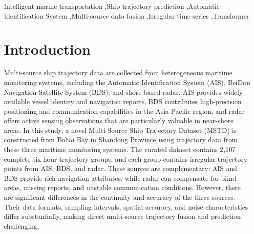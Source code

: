 \documentclass[a4paper,fleqn]{cas-dc}
\begin{document}
\begin{keywords}
Intelligent marine transportation \sep Ship trajectory prediction
\sep Automatic Identification System \sep Multi-source data fusion \sep Irregular time series \sep Transformer
\end{keywords}

\makeatletter{}\makeatother
\maketitle{}

\section{Introduction}

Multi-source ship trajectory data are collected from heterogeneous maritime monitoring systems, including the Automatic Identification System (AIS), BeiDou Navigation Satellite System (BDS), and shore-based radar. AIS provides widely available vessel identity and navigation reports, BDS contributes high-precision positioning and communication capabilities in the Asia-Pacific region, and radar offers active sensing observations that are particularly valuable in near-shore areas. In this study, a novel Multi-Source Ship Trajectory Dataset (MSTD) is constructed from Bohai Bay in Shandong Province using trajectory data from these three maritime monitoring systems. The curated dataset contains 2,107 complete six-hour trajectory groups, and each group contains irregular trajectory points from AIS, BDS, and radar. These sources are complementary: AIS and BDS provide rich navigation attributes, while radar can compensate for blind areas, missing reports, and unstable communication conditions. However, there are significant differences in the continuity and accuracy of the three sources. Their data formats, sampling intervals, spatial accuracy, and noise characteristics differ substantially, making direct multi-source trajectory fusion and prediction challenging.
\end{document}

